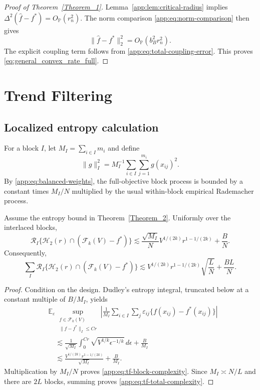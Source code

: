 \documentclass[twoside,11pt]{article}
\newenvironment{revision}{\color{revisionred}}{}
\begin{document}
\begin{revision}
\begin{proof}[Proof of Theorem~\ref{Theorem_1}]
Lemma~\ref{app:lem:critical-radius} implies
$\Delta^2(\widehat f-f^*)=O_{\mathbb P}(r_n^2)$.  The norm comparison
\eqref{app:eq:norm-comparison} then gives
\[
 \|\widehat f-f^*\|_2^2=O_{\mathbb P}(b_B^2r_n^2).
\]
The explicit coupling term follows from
\eqref{app:eq:total-coupling-error}.  This proves
\eqref{eq:general_convex_rate_full}.
\end{proof}


\section{Trend Filtering}
\label{app:trend-filtering}

\subsection{Localized entropy calculation}

For a block $I$, let $M_I=\sum_{i\in I}m_i$ and define
\[
 \|g\|_{I}^2=M_I^{-1}\sum_{i\in I}\sum_{j=1}^{m_i}g(x_{ij})^2.
\]
By \eqref{app:eq:balanced-weights}, the full-objective block process is bounded
by a constant times $M_I/N$ multiplied by the usual within-block empirical
Rademacher process.

\begin{lemma}
\label{app:lem:tf-complexity}
Assume the entropy bound in Theorem~\ref{Theorem_2}.  Uniformly over the
interlaced blocks,
\begin{equation}
 \mathcal R_I\{\mathcal H_2(r)\cap(\mathcal F_k(V)-f^*)\}
 \lesssim
 \frac{\sqrt{M_I}}{N}V^{1/(2k)}r^{1-1/(2k)}
 +\frac{B}{N}.                                                  \label{app:eq:tf-block-complexity}
\end{equation}
Consequently,
\begin{equation}
 \sum_I\mathcal R_I\{\mathcal H_2(r)\cap(\mathcal F_k(V)-f^*)\}
 \lesssim
 V^{1/(2k)}r^{1-1/(2k)}\sqrt{\frac{L}{N}}
 +\frac{BL}{N}.                                                 \label{app:eq:tf-total-complexity}
\end{equation}
\end{lemma}

\begin{proof}
Condition on the design.  Dudley's entropy integral, truncated below at a
constant multiple of $B/M_I$, yields
\begin{align*}
 &\mathbb E_\varepsilon\sup_{\substack{f\in\mathcal F_k(V)\\
 \|f-f^*\|_I\le Cr}}
 \left|\frac1{M_I}\sum_{i\in I}\sum_j\varepsilon_{ij}
 \{f(x_{ij})-f^*(x_{ij})\}\right|\\
 &\quad\lesssim \frac1{\sqrt{M_I}}
 \int_0^{Cr}\sqrt{V^{1/k}\epsilon^{-1/k}}\,d\epsilon
 +\frac{B}{M_I}\\
 &\quad\lesssim
 \frac{V^{1/(2k)}r^{1-1/(2k)}}{\sqrt{M_I}}+\frac{B}{M_I}.
\end{align*}
Multiplication by $M_I/N$ proves
\eqref{app:eq:tf-block-complexity}.  Since $M_I\asymp N/L$ and there are
$2L$ blocks, summing proves \eqref{app:eq:tf-total-complexity}.
\end{proof}


\end{revision}
\end{document}
